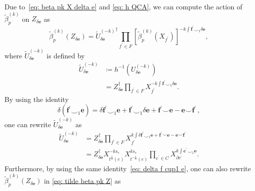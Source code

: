 \documentclass[aps,twocolumn,prx,floatfix,preprintnumbers, nofootinbib,10pt]{revtex4-2}
\numberwithin{equation}{section}
\theoremstyle{definition}
\theoremstyle{remark}
\theoremstyle{claim}
\begin{document}
Due to~\eqref{eq: beta pk X delta e} and \eqref{eq: h QCA}, we can compute the action of $\tilde{\beta}_p^{(k)}$ on $Z_{\delta \bm{e}}$ as
\begin{equation}
\tilde{\beta}_p^{(k)}(Z_{\delta \bm{e}}) = \left.\widetilde{U}_{\delta \bm{e}}^{(-k)}\right.^{\dagger} \prod_{f^{\prime} \in F} \left[\tilde{\beta}_p^{(k)}(X_{f^{\prime}})\right]^{-k \int \bm{f}^{\prime} \smile_1 \delta \bm{e}},
\label{eq: tilde beta pk Z}
\end{equation}
where $\widetilde{U}_{\delta \bm{e}}^{(-k)}$ is defined by
\begin{equation}
\begin{aligned}
\widetilde{U}_{\delta \bm{e}}^{(-k)}
&\coloneq h^{-1}(U_{\delta \bm{e}}^{(-k)}) \\
&= Z_{\delta \bm{e}}^{\dagger} \prod_{f^{\prime} \in F} X_{f^{\prime}}^{-k \int \bm{f}^{\prime} \smile_1 \delta \bm{e}}.
\end{aligned}
\end{equation}
By using the identity
\begin{equation}
\delta (\bm{f}^{\prime} \smile_1 \bm{e}) = \delta \bm{f}^{\prime} \smile_1 \bm{e} + \bm{f}^{\prime} \smile_1 \delta \bm{e} + \bm{f}^{\prime} \smile \bm{e} - \bm{e} \smile \bm{f}^{\prime} \,,
\label{eq: delta f cup1 e}
\end{equation}
one can rewrite $\widetilde{U}_{\delta \bm{e}}^{(-k)}$ as
\begin{equation}
\begin{aligned}
\widetilde{U}_{\delta \bm{e}}^{(-k)}
&= Z_{\delta \bm{e}}^{\dagger} \prod_{f^{\prime} \in F} X_{f^{\prime}}^{k \int \delta \bm{f}^{\prime} \smile_1 \bm{e} + \bm{f}^{\prime} \smile \bm{e} - \bm{e} \smile \bm{f}^{\prime}} \\
&= Z_{\delta \bm{e}}^{\dagger} X_{t^{\frac{1}{2}}(e)}^{-k s_e} X_{t^{-\frac{1}{2}}(e)}^{k s_e} \prod_{c^{\prime} \in C} X_{\partial c^{\prime}}^{k \int \bm{c}^{\prime} \smile_1 \bm{e}}.
\end{aligned}
\label{eq: U tilde delta e}
\end{equation}
Furthermore, by using the same identity~\eqref{eq: delta f cup1 e}, one can also rewrite $\tilde{\beta}_p^{(k)}(Z_{\delta \bm{e}})$ in \eqref{eq: tilde beta pk Z} as
\end{document}
